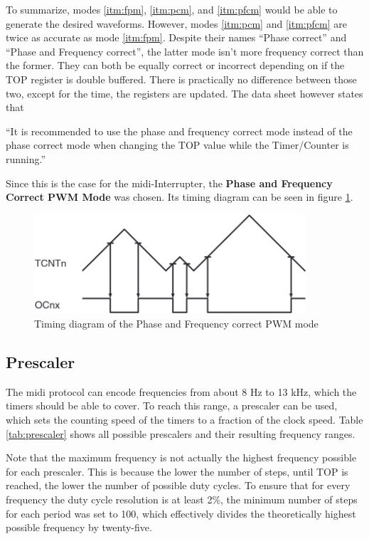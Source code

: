 To summarize, modes \ref{itm:fpm}, \ref{itm:pcm}, and \ref{itm:pfcm} would be able to generate the desired waveforms. However, modes \ref{itm:pcm} and \ref{itm:pfcm} are twice as accurate as mode \ref{itm:fpm}. Despite their names \enquote{Phase correct} and \enquote{Phase and Frequency correct}, the latter mode isn't more frequency correct than the former. They can both be equally correct or incorrect depending on if the TOP register is double buffered. There is practically no difference between those two, except for the time, the registers are updated. The data sheet however states that

\begin{displayquote}
\enquote{It is recommended to use the phase and frequency correct mode instead of the phase correct mode when changing the TOP value while the Timer/Counter is running.}
\end{displayquote}

Since this is the case for the \gls{midi}-Interrupter, the \textbf{Phase and Frequency Correct PWM Mode} was chosen. Its timing diagram can be seen in figure \ref{fig:timer_diagram}.

\begin{figure}[h!]
    \centering
    \includegraphics[width=0.9\textwidth]{felix/resources/timer_diagram.png}
    \caption{Timing diagram of the Phase and Frequency correct PWM mode}
    \label{fig:timer_diagram}
\end{figure}

\subsection{Prescaler}

The \gls{midi} protocol can encode frequencies from about 8 Hz to 13 kHz, which the timers should be able to cover. To reach this range, a prescaler can be used, which sets the counting speed of the timers to a fraction of the clock speed. Table \ref{tab:prescaler} shows all possible prescalers and their resulting frequency ranges.

Note that the maximum frequency is not actually the highest frequency possible for each prescaler. This is because the lower the number of steps, until TOP is reached, the lower the number of possible duty cycles. To ensure that for every frequency the duty cycle resolution is at least 2\%, the minimum number of steps for each period was set to 100, which effectively divides the theoretically highest possible frequency by twenty-five.

